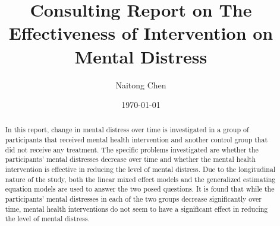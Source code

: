 \documentclass[10pt]{article}
\title{Consulting Report on The Effectiveness of Intervention on Mental Distress} %
\author{Naitong Chen} %
\date{\today} %
\begin{document}
\maketitle
\bigskip\bigskip\bigskip\bigskip\bigskip
\bigskip\bigskip\bigskip\bigskip\bigskip
\bigskip\bigskip\bigskip\bigskip\bigskip
\bigskip\bigskip\bigskip\bigskip\bigskip
\begin{abstract}
In this report, change in mental distress over time is investigated in a group of participants that received mental health intervention and another control group that did not receive any treatment. The specific problems investigated are whether the participants' mental distresses decrease over time and whether the mental health intervention is effective in reducing the level of mental distress. Due to the longitudinal nature of the study, both the linear mixed effect models and the generalized estimating equation models are used to answer the two posed questions. It is found that while the participants' mental distresses in each of the two groups decrease significantly over time, mental health interventions do not seem to have a significant effect in reducing the level of mental distress.
\end{abstract}
\thispagestyle{empty}
\clearpage
{}





\clearpage
\printbibliography

\clearpage
\appendix

\end{document}
